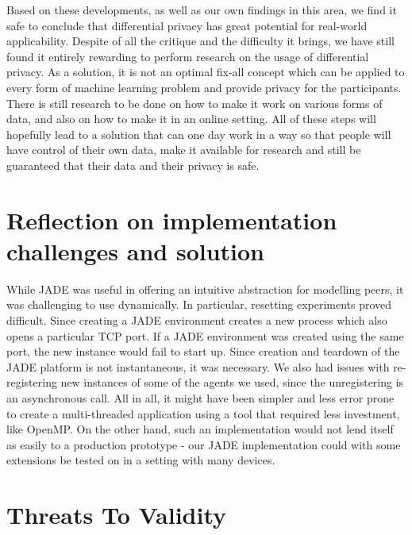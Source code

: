 Based on these developments, as well as our own findings in this area, we find it safe to conclude that differential privacy has great potential for real-world applicability. Despite of all the critique and the difficulty it brings, we have still found it entirely rewarding to perform research on the usage of differential privacy. As a solution, it is not an optimal fix-all concept which can be applied to every form of machine learning problem and provide privacy for the participants. There is still research to be done on how to make it work on various forms of data, and also on how to make it in an online setting. All of these steps will hopefully lead to a solution that can one day work in a way so that people will have control of their own data, make it available for research and still be guaranteed that their data and their privacy is safe. 
\section{Reflection on implementation challenges and solution}

While JADE was useful in offering an intuitive abstraction for modelling peers, it was challenging to use dynamically. In particular, resetting experiments proved difficult. Since creating a JADE environment creates a new process which also opens a particular TCP port. If a JADE environment was created using the same port, the new instance would fail to start up. Since creation and teardown of the JADE platform is not instantaneous, it was necessary. We also had issues with re-registering new instances of some of the agents we used, since the unregistering is an asynchronous call. All in all, it might have been simpler and less error prone to create a multi-threaded application using a tool that required less investment, like OpenMP. On the other hand, such an implementation would not lend itself as easily to a production prototype - our JADE implementation could with some extensions be tested on in a setting with many devices.



\section{Threats To Validity}

